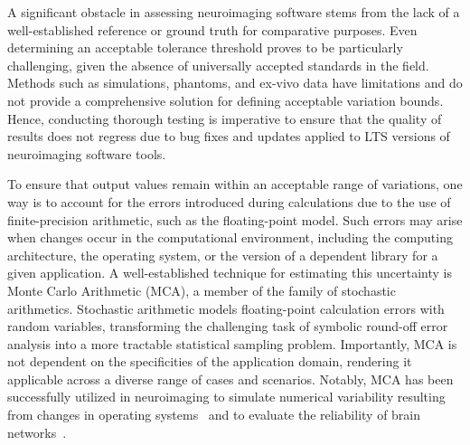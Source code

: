 \documentclass[lettersize,journal]{IEEEtran}
\begin{document}
A significant obstacle in assessing neuroimaging software stems from the lack of a well-established reference or ground truth for comparative purposes. Even determining an acceptable tolerance threshold proves to be particularly challenging, given the absence of universally accepted standards in the field. Methods such as simulations, phantoms, and ex-vivo data have limitations and do not provide a comprehensive solution for defining acceptable variation bounds. Hence, conducting thorough testing is imperative to ensure that the quality of results does not regress due to bug fixes and updates applied to LTS versions of neuroimaging software tools.

To ensure that output values remain within an acceptable range of variations, one way is to account for the errors introduced during calculations due to the use of finite-precision arithmetic, such as the floating-point model. Such errors may arise when changes occur in the computational environment, including the computing architecture, the operating system, or the version of a dependent library for a given application. A well-established technique for estimating this uncertainty is Monte Carlo Arithmetic (MCA), a member of the family of stochastic arithmetics. Stochastic arithmetic models floating-point calculation errors with random variables, transforming the challenging task of symbolic round-off error analysis into a more tractable statistical sampling problem. Importantly, MCA is not dependent on the specificities of the application domain, rendering it applicable across a diverse range of cases and scenarios. Notably, MCA has been successfully utilized in neuroimaging to simulate numerical variability resulting from changes in operating systems~\cite{salari2021accurate} and to evaluate the reliability of brain networks~\cite{kiar2021numerical}.


\end{document}
